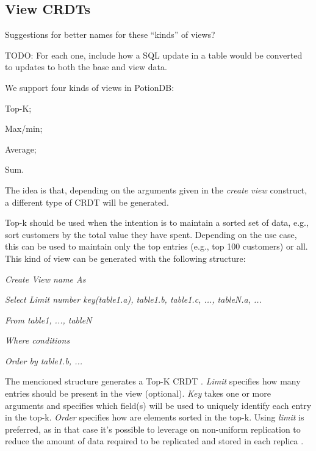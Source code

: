 \documentclass{vldb}
\newcommand{\grumbler}[2]{{\color{red}{\bf #1:} #2}}
\newcommand{\andre}[1]{\grumbler{andre}{#1}}
\newcommand{\emphvspace}{0.5\baselineskip}
\newcommand{\firstblockemph}[1]{\vspace{\emphvspace}\hspace{2em}\emph{#1}}
\newcommand{\middleblockemph}[1]{\hspace{2em}\emph{#1}}
\newcommand{\lastblockemph}[1]{\hspace{2em}\emph{#1}\vspace{\emphvspace}}
\begin{document}

\subsection{View CRDTs}

\andre{Suggestions for better names for these ``kinds'' of views?}

\andre{TODO: For each one, include how a SQL update in a table would be converted to updates to both the base and view data.}

We support four kinds of views in PotionDB:
\begin{enumerate*}[label=(\roman*)]
	\item Top-K;
	\item Max/min;
	\item Average;
	\item Sum.
\end{enumerate*}
The idea is that, depending on the arguments given in the \emph{create view} construct, a different type of CRDT will be generated.

Top-k should be used when the intention is to maintain a sorted set of data, e.g., sort customers by the total value they have spent.
Depending on the use case, this can be used to maintain only the top entries (e.g., top 100 customers) or all.
This kind of view can be generated with the following structure:

\firstblockemph{Create View name As}

\middleblockemph{Select Limit number key(table1.a), table1.b, table1.c, ..., tableN.a, ...}

\middleblockemph{From table1, ..., tableN}

\middleblockemph{Where conditions}

\lastblockemph{Order by table1.b, ...}

The mencioned structure generates a Top-K CRDT \cite{???}.
\emph{Limit} specifies how many entries should be present in the view (optional). \emph{Key} takes one or more arguments and specifies which field(s) will be used to uniquely identify each entry in the top-k.
\emph{Order} specifies how are elements sorted in the top-k.
Using \emph{limit} is preferred, as in that case it's possible to leverage on non-uniform replication to reduce the amount of data required to be replicated and stored in each replica \cite{???}.
\end{document}
